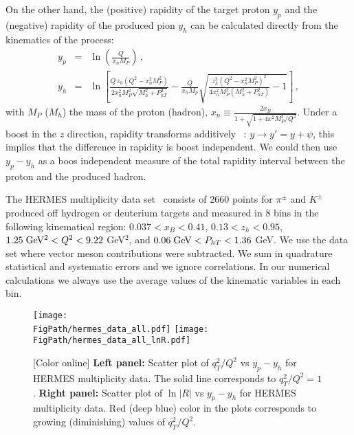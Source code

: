 \documentclass[final,3p,times,onecolumn,sort&compress,hidelinks]{elsarticle}
\newcommand\3[1]{\boldsymbol{#1}}
\newcommand*{\FigPath}{../Figs/}%
\begin{document}
On the other hand, the (positive) rapidity of the target proton $y_p$ and the (negative) rapidity of the produced pion $y_h$ can be calculated directly from the kinematics of the process:
\begin{eqnarray}
y_p &=& \ln \left( \frac{Q}{x_n M_P}\right) \,,\\
y_h &=& \ln\left[\frac{Q\,z_h(Q^2-x_n^2M_P^2)} {2x_n^2M_P^2\sqrt{M_h^2+P_{hT}^2}} -\frac{Q} {x_nM_p}\sqrt{\frac{z_h^2(Q^2-x_n^2M_P^2)^2} {4x_n^2M_P^2(M_h^2+P_{hT}^2)}-1}\right]\,,
\end{eqnarray}
with $M_P$ ($M_h$) the mass of the proton (hadron), $x_n\equiv \frac{2x_B} {1+\sqrt{1+4x^2M_P^2/Q^2}}$. Under a boost in the  $z$ direction, rapidity transforms additively ~\cite{Collins:2011zzd}: $y \to y' = y+\psi$, this implies that the difference in rapidity is boost independent. We could then use $y_p - y_h$ as a boos independent measure of the total rapidity interval between the proton and the produced hadron.

The HERMES multiplicity data set~\cite{Airapetian:2012ki} consists of 2660 points for $\pi^\pm$ and $K^\pm$ produced off hydrogen or deuterium targets and measured in 8 bins in the following kinematical region: $0.037 < x_B < 0.41$, $0.13 < z_h < 0.95$, $1.25\; {\rm GeV^2} < Q^2 < 9.22$ GeV$^2$,  and $0.06 \; {\rm GeV} < P_{hT} < 1.36$ GeV. We use the data set where vector meson contributions were subtracted. We sum in quadrature statistical and systematic errors and we ignore correlations. In our numerical calculations we always use the average values of the kinematic variables in each bin.
\begin{figure}[htb!]
\centering
\texttt{[image: \\FigPath/hermes\_data\_all.pdf]}
\texttt{[image: \\FigPath/hermes\_data\_all\_lnR.pdf]}
\caption{\label{Fig:hermes_data_rapidity}
[Color online]  {\bf Left panel:} Scatter plot of $q_T^2/Q^2$ vs $y_p-y_h$ for HERMES multiplicity data.  The solid line corresponds to $q_T^2/Q^2=1$. {\bf Right panel:} Scatter plot of $\ln|R|$  vs $y_p-y_h$ for HERMES multiplicity data. Red (deep blue) color in the plots corresponds to growing (diminishing) values of $q_T^2/Q^2$.
}
\end{figure}
\end{document}
